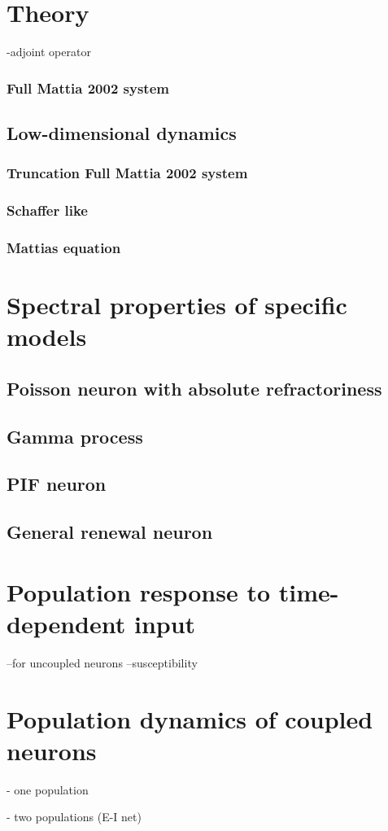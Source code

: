 \documentclass{report}
\begin{document}
\chapter{Theory}
\label{chap:theo}

-adjoint operator
\subsection{Full Mattia 2002 system}

\section{Low-dimensional dynamics}

\subsection{Truncation Full Mattia 2002 system}

\subsection{Schaffer like}

\subsection{Mattias equation}



\chapter{Spectral properties of specific models}
\label{chap:specif-model}


\section{Poisson neuron with absolute refractoriness}
\label{sec:absref}

\section{Gamma process}

\section{PIF neuron}
\label{sec:pif}


\section{General renewal neuron}
\label{sec:gen-renw}

\chapter{Population response to time-dependent input}

--for uncoupled neurons
--susceptibility

\chapter{Population dynamics of coupled neurons}

- one population

- two populations (E-I net)



\end{document}
